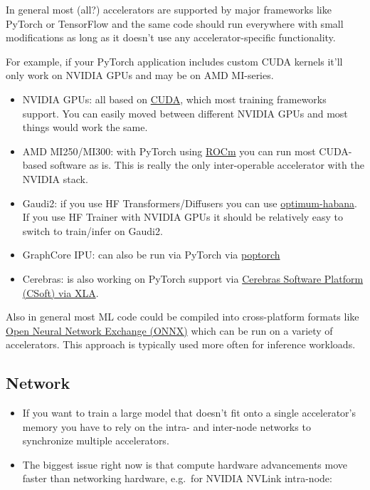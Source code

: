 \documentclass[
]{report}
\begin{document}
In general most (all?) accelerators are supported by major frameworks
like PyTorch or TensorFlow and the same code should run everywhere with
small modifications as long as it doesn't use any accelerator-specific
functionality.

For example, if your PyTorch application includes custom CUDA kernels
it'll only work on NVIDIA GPUs and may be on AMD MI-series.

\begin{itemize}
\item
  NVIDIA GPUs: all based on
  \href{https://developer.nvidia.com/cuda-toolkit}{CUDA}, which most
  training frameworks support. You can easily moved between different
  NVIDIA GPUs and most things would work the same.
\item
  AMD MI250/MI300: with PyTorch using
  \href{https://pytorch.org/blog/pytorch-for-amd-rocm-platform-now-available-as-python-package/}{ROCm}
  you can run most CUDA-based software as is. This is really the only
  inter-operable accelerator with the NVIDIA stack.
\item
  Gaudi2: if you use HF Transformers/Diffusers you can use
  \href{https://github.com/huggingface/optimum-habana}{optimum-habana}.
  If you use HF Trainer with NVIDIA GPUs it should be relatively easy to
  switch to train/infer on Gaudi2.
\item
  GraphCore IPU: can also be run via PyTorch via
  \href{https://github.com/graphcore/poptorch}{poptorch}
\item
  Cerebras: is also working on PyTorch support via
  \href{https://www.cerebras.net/blog/supporting-pytorch-on-the-cerebras-wafer-scale-engine/}{Cerebras
  Software Platform (CSoft) via XLA}.
\end{itemize}

Also in general most ML code could be compiled into cross-platform
formats like
\href{https://en.wikipedia.org/wiki/Open_Neural_Network_Exchange}{Open
Neural Network Exchange (ONNX)} which can be run on a variety of
accelerators. This approach is typically used more often for inference
workloads.

\subsection{Network}\label{network}

\begin{itemize}
\item
  If you want to train a large model that doesn't fit onto a single
  accelerator's memory you have to rely on the intra- and inter-node
  networks to synchronize multiple accelerators.
\item
  The biggest issue right now is that compute hardware advancements move
  faster than networking hardware, e.g.~for NVIDIA NVLink intra-node:
\end{itemize}
\end{document}
